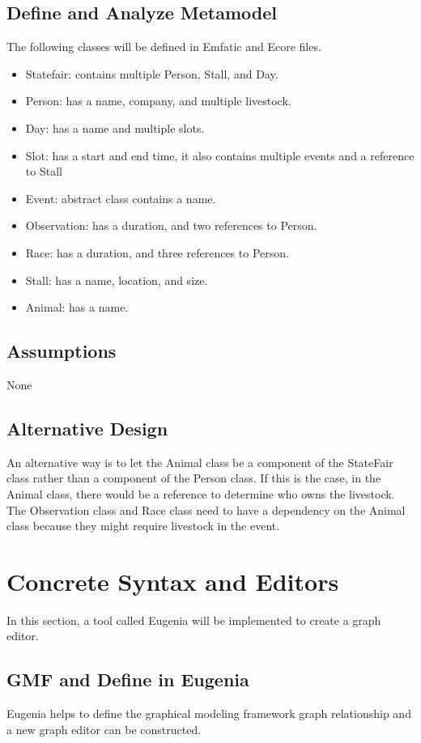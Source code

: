 \documentclass[12pt]{article}
\begin{document}
\subsection{Define and Analyze Metamodel}
The following classes will be defined in Emfatic and Ecore files.
\begin{itemize}
    \item Statefair: contains multiple Person, Stall, and Day.
    \item Person: has a name, company, and multiple livestock.
    \item Day: has a name and multiple slots.
    \item Slot: has a start and end time, it also contains multiple events and a reference to Stall 
    \item Event: abstract class contains a name.
    \item Observation: has a duration, and two references to Person.
    \item Race: has a duration, and three references to Person.
    \item Stall: has a name, location, and size.
    \item Animal: has a name.
\end{itemize}

\subsection{Assumptions}
None

\subsection{Alternative Design}
An alternative way is to let the Animal class be a component of the StateFair class rather 
than a component of the Person class. 
If this is the case, in the Animal class, there would be a reference to determine who owns the livestock. 
The Observation class and Race class need to have a dependency on the Animal class 
because they might require livestock in the event.

\pagebreak
\section{Concrete Syntax and Editors}
In this section, a tool called Eugenia will be implemented to create a graph editor.

\subsection{GMF and Define in Eugenia}
Eugenia helps to define the graphical modeling framework graph relationship and a new 
graph editor can be constructed.
\end{document}
